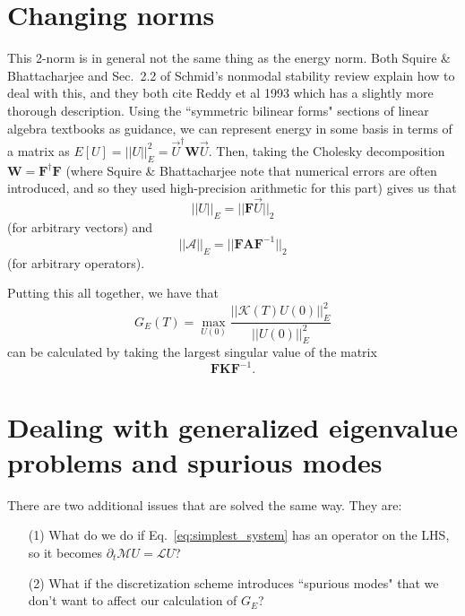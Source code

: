 \documentclass[aps,pop,preprint]{revtex4}
\begin{document}
\section{Changing norms}
\label{sec:norms}
This 2-norm is in general not the same thing as the energy norm. 
Both Squire \& Bhattacharjee and Sec.~2.2 of Schmid's nonmodal stability review explain how to deal with this, and they both cite Reddy et al 1993 which has a slightly more thorough description. 
Using the ``symmetric bilinear forms" sections of linear algebra textbooks as guidance, we can represent energy in some basis in terms of a matrix as $E[U] = ||U||_E^2 = \vec{U}^\dagger\mathbf{W}\vec{U}$. 
Then, taking the Cholesky decomposition $\mathbf{W} = \mathbf{F}^\dagger \mathbf{F}$ (where Squire \& Bhattacharjee note that numerical errors are often introduced, and so they used high-precision arithmetic for this part) gives us that 
\begin{equation}
||U||_E = ||\mathbf{F}\vec{U}||_2
\label{eq:E_norm_vector}
\end{equation}
(for arbitrary vectors) and
\begin{equation}
||\mathcal{A}||_E = ||\mathbf{F} \mathbf{A} \mathbf{F}^{-1} ||_2
\label{eq:E_norm_matrix}
\end{equation}
(for arbitrary operators).

Putting this all together, we have that
\begin{equation}
G_E(T) = \max_{U(0)} \frac{||\mathcal{K}(T) U(0) ||_E^2}{||U(0)||_E^2}
\label{eq:energy_gain_def}
\end{equation}
can be calculated by taking the largest singular value of the matrix
\begin{equation}
\mathbf{F} \mathbf{K} \mathbf{F}^{-1}.
\label{eq:propagator_Enorm}
\end{equation}

\section{Dealing with generalized eigenvalue problems and spurious modes}
\label{sec:eigen-subspace}
There are two additional issues that are solved the same way. 
They are:
\begin{itemize}
\item[(1)] What do we do if Eq.~\eqref{eq:simplest_system} has an operator on the LHS, so it becomes $\partial_t \mathcal{M} U = \mathcal{L} U$?
\item[(2)] What if the discretization scheme introduces ``spurious modes" that we don't want to affect our calculation of $G_E$?
\end{itemize}
\end{document}
